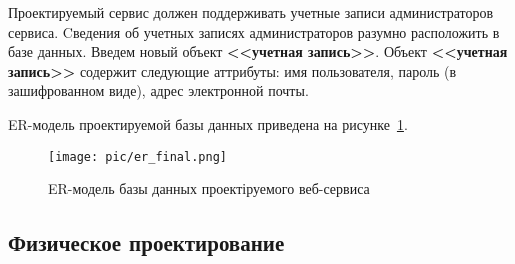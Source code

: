 Проектируемый сервис должен поддерживать учетные записи администраторов сервиса.
Cведения об учетных записях администраторов разумно
расположить в базе данных. Введем новый объект \textbf{<<учетная запись>>}.
Объект \textbf{<<учетная запись>>} содержит следующие аттрибуты:
имя пользователя, пароль (в зашифрованном виде), адрес электронной почты.

ER-модель проектируемой базы данных приведена на рисунке~\ref{fig:er_final}.

\begin{figure}[h]
  \centering
  \texttt{[image: pic/er\_final.png]}
  \caption{ER-модель базы данных проектіруемого веб-сервиса}
  \label{fig:er_final}
\end{figure}


\subsection{Физическое проектирование}
\label{ssub:db_physical_stage}











